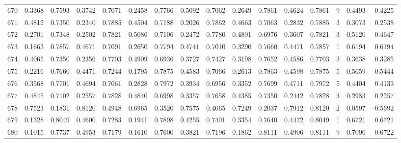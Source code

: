 \begin{tabular}{lrrrrrrrrrrrrrrr}
670 &      0.3368 &  0.7593 &  0.3742 &  0.7071 &  0.2458 &  0.7766 &  0.5092 &  0.7062 &  0.2649 &  0.7861 &   0.4624 &     0.7861 &      9 &                    0.4493 &                     0.4225 \\
671 &      0.4812 &  0.7350 &  0.2340 &  0.7885 &  0.4504 &  0.7188 &  0.2026 &  0.7862 &  0.4663 &  0.7063 &   0.2832 &     0.7885 &      3 &                    0.3073 &                     0.2538 \\
672 &      0.2701 &  0.7348 &  0.2502 &  0.7821 &  0.5086 &  0.7106 &  0.2472 &  0.7780 &  0.4801 &  0.6976 &   0.3607 &     0.7821 &      3 &                    0.5120 &                     0.4647 \\
673 &      0.1663 &  0.7857 &  0.4671 &  0.7091 &  0.2650 &  0.7794 &  0.4741 &  0.7010 &  0.3290 &  0.7660 &   0.4471 &     0.7857 &      1 &                    0.6194 &                     0.6194 \\
674 &      0.4065 &  0.7350 &  0.2356 &  0.7703 &  0.4909 &  0.6936 &  0.3727 &  0.7427 &  0.3198 &  0.7652 &   0.4586 &     0.7703 &      3 &                    0.3638 &                     0.3285 \\
675 &      0.2216 &  0.7660 &  0.4471 &  0.7244 &  0.1795 &  0.7875 &  0.4583 &  0.7066 &  0.2613 &  0.7863 &   0.4598 &     0.7875 &      5 &                    0.5659 &                     0.5444 \\
676 &      0.3568 &  0.7701 &  0.4694 &  0.7061 &  0.2828 &  0.7972 &  0.3934 &  0.6956 &  0.3352 &  0.7699 &   0.4711 &     0.7972 &      5 &                    0.4404 &                     0.4133 \\
677 &      0.4845 &  0.7102 &  0.2557 &  0.7828 &  0.4840 &  0.6998 &  0.3357 &  0.7658 &  0.4385 &  0.7350 &   0.2442 &     0.7828 &      3 &                    0.2983 &                     0.2257 \\
678 &      0.7523 &  0.1831 &  0.8120 &  0.4948 &  0.6965 &  0.3520 &  0.7575 &  0.4065 &  0.7249 &  0.2037 &   0.7912 &     0.8120 &      2 &                    0.0597 &                    -0.5692 \\
679 &      0.1328 &  0.8049 &  0.4600 &  0.7283 &  0.1941 &  0.7898 &  0.4255 &  0.7401 &  0.3354 &  0.7640 &   0.4472 &     0.8049 &      1 &                    0.6721 &                     0.6721 \\
680 &      0.1015 &  0.7737 &  0.4953 &  0.7179 &  0.1610 &  0.7600 &  0.3821 &  0.7196 &  0.1862 &  0.8111 &   0.4906 &     0.8111 &      9 &                    0.7096 &                     0.6722 \\

\end{tabular}
